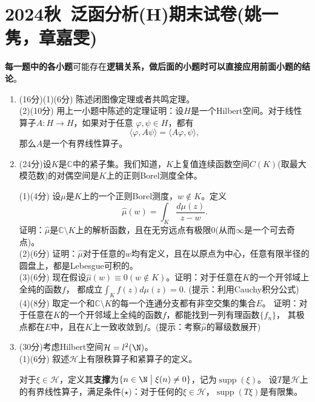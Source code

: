 \section{2024秋\ 泛函分析(H)期末试卷(姚一隽，章嘉雯)}
\textbf{每一题中的各小题}可能存在\textbf{逻辑关系，做后面的小题时可以直接应用前面小题的结论}。\\
\begin{enumerate}
    \item (16分)(1)(6分) 陈述闭图像定理或者共鸣定理。\\
    (2)(10分) 用上一小题中陈述的定理证明：设$H$是一个Hilbert空间。对于线性算子$A:H\to H$，如果对于任意
    $\varphi,\psi \in H$，都有
    \[\langle\varphi, A\psi\rangle=\langle A\varphi,\psi\rangle,\]
    那么$A$是一个有界线性算子。
    
    \item (24分)设$K$是$\mathbb{C}$中的紧子集。我们知道，$K$上复值连续函数空间$C(K)$(取最大模范数)的对偶空间是$K$上的正则Borel测度全体。

    (1)(4分) 设$\mu$是$K$上的一个正则Borel测度，$w\notin K$。定义
    \[\widehat{\mu}(w)=\int_K\frac{d\mu(z)}{z-w}.\]
    证明：$\widehat{\mu}$是$\mathbb{C} \setminus K$上的解析函数，且在无穷远点有极限$0$(从而$\infty$是一个可去奇点)。\\
    (2)(6分) 证明：$\widehat{\mu}$对于任意的$w$均有定义，且在以原点为中心，任意有限半径的圆盘上，都是Lebesgue可积的。\\
    (3)(6分) 现在假设$\widehat{\mu}(w)\equiv0(w\notin K)$。证明：对于任意在$K$的一个开邻域上全纯的函数$f$，
    都成立$\displaystyle \int_Kf(z)d\mu(z)=0$. (提示：利用Cauchy积分公式)\\
    (4)(8分) 取定一个和$\mathbb{C} \setminus K$的每一个连通分支都有非空交集的集合$E$。
    证明：对于任意在$K$的一个开邻域上全纯的函数$f$，都能找到一列有理函数$\{f_n\}$，
    其极点都在$E$中，且在$K$上一致收敛到$f$。(提示：考察$\widehat{\mu}$的幂级数展开)\\
    [上传者注：本结论称为Runge定理，具体见\cite{i} III.8节.]

    \item (30分)考虑Hilbert空间$\mathcal{H}=l^2(\N)$。\\
    (1)(6分) 叙述$\mathcal{H}$上有限秩算子和紧算子的定义。

    对于$\xi \in \mathcal{H}$，定义其\textbf{支撑}为$\{n\in\N\bigm|\xi(n)\ne0\}$，记为$\operatorname{supp}(\xi)$。
    设$T$是$\mathcal{H}$上的有界线性算子，满足条件($\star$)：对于任何的$\xi \in \mathcal{H}$，$\operatorname{supp}(T\xi)$是有限集。
    

\end{enumerate}
